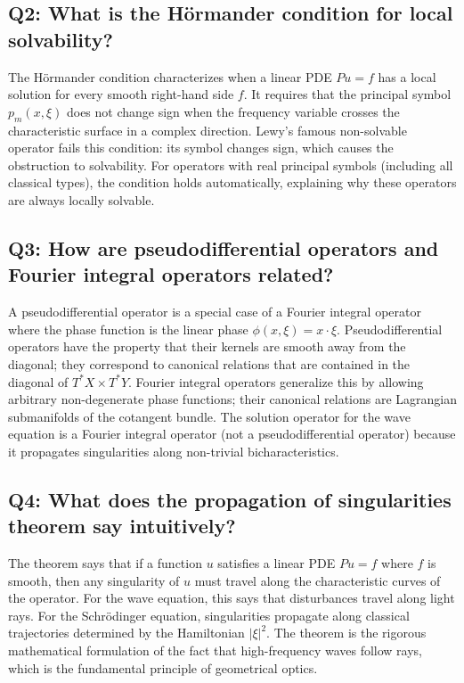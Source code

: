 \subsection*{Q2: What is the H\"ormander condition for local
solvability?}

The H\"ormander condition characterizes when a linear PDE
\(Pu = f\) has a local solution for every smooth right-hand side \(f\).
It requires that the principal symbol \(p_m(x,\xi)\) does not change
sign when the frequency variable crosses the characteristic surface in
a complex direction. Lewy's famous non-solvable operator fails this
condition: its symbol changes sign, which causes the obstruction to
solvability. For operators with real principal symbols (including all
classical types), the condition holds automatically, explaining why
these operators are always locally solvable.

\subsection*{Q3: How are pseudodifferential operators and Fourier
integral operators related?}

A pseudodifferential operator is a special case of a Fourier integral
operator where the phase function is the linear phase
\(\phi(x,\xi) = x \cdot \xi\). Pseudodifferential operators have the
property that their kernels are smooth away from the diagonal; they
correspond to canonical relations that are contained in the diagonal of
\(T^*X \times T^*Y\). Fourier integral operators generalize this by
allowing arbitrary non-degenerate phase functions; their canonical
relations are Lagrangian submanifolds of the cotangent bundle. The
solution operator for the wave equation is a Fourier integral operator
(not a pseudodifferential operator) because it propagates singularities
along non-trivial bicharacteristics.

\subsection*{Q4: What does the propagation of singularities theorem
say intuitively?}

The theorem says that if a function \(u\) satisfies a linear PDE
\(Pu = f\) where \(f\) is smooth, then any singularity of \(u\) must
travel along the characteristic curves of the operator. For the wave
equation, this says that disturbances travel along light rays. For the
Schr\"odinger equation, singularities propagate along classical
trajectories determined by the Hamiltonian \(|\xi|^2\). The theorem is
the rigorous mathematical formulation of the fact that
high-frequency waves follow rays, which is the fundamental principle of
geometrical optics.

